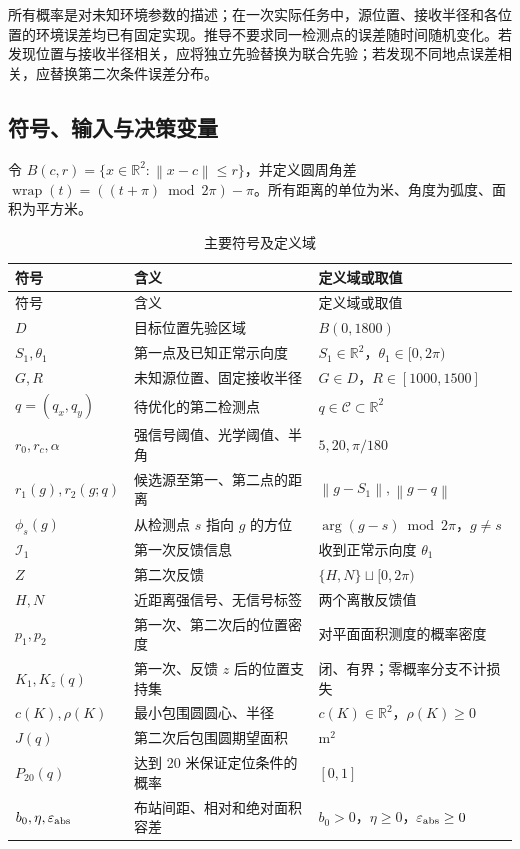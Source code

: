 \documentclass[UTF8,a4paper,zihao=-4,fontset=none]{ctexart}
\numberwithin{equation}{section}
\theoremstyle{definition}
\newcommand{\R}{\mathbb R}
\newcommand{\norm}[1]{\left\lVert #1\right\rVert}
\newcommand{\wrap}{\operatorname{wrap}}
\begin{document}
所有概率是对未知环境参数的描述；在一次实际任务中，源位置、接收半径和各位置的环境误差均已有固定实现。推导不要求同一检测点的误差随时间随机变化。若发现位置与接收半径相关，应将独立先验替换为联合先验；若发现不同地点误差相关，应替换第二次条件误差分布。

\subsection{符号、输入与决策变量}
令 \(B(c,r)=\{x\in\R^2:\norm{x-c}\le r\}\)，并定义圆周角差 \(\wrap(t)=((t+\pi)\bmod 2\pi)-\pi\)。所有距离的单位为米、角度为弧度、面积为平方米。

\begin{longtable}{p{}p{}p{}}
\caption{主要符号及定义域}\label{tab:symbols}\\
\toprule 符号 & 含义 & 定义域或取值 \\
\midrule\endfirsthead
\toprule 符号 & 含义 & 定义域或取值 \\
\midrule\endhead
\bottomrule\endfoot
\(D\) & 目标位置先验区域 & \(B(0,1800)\) \\
\(S_1,\theta_1\) & 第一点及已知正常示向度 & \(S_1\in\R^2\)，\(\theta_1\in[0,2\pi)\) \\
\(G,R\) & 未知源位置、固定接收半径 & \(G\in D\)，\(R\in[1000,1500]\) \\
\(q=(q_x,q_y)\) & 待优化的第二检测点 & \(q\in\mathcal C\subset\R^2\) \\
\(r_0,r_c,\alpha\) & 强信号阈值、光学阈值、半角 & \(5,20,\pi/180\) \\
\(r_1(g),r_2(g;q)\) & 候选源至第一、第二点的距离 & \(\norm{g-S_1},\norm{g-q}\) \\
\(\phi_s(g)\) & 从检测点 \(s\) 指向 \(g\) 的方位 & \(\arg(g-s)\bmod2\pi\)，\(g\ne s\) \\
\(\mathcal I_1\) & 第一次反馈信息 & 收到正常示向度 \(\theta_1\) \\
\(Z\) & 第二次反馈 & \(\{H,N\}\sqcup[0,2\pi)\) \\
\(H,N\) & 近距离强信号、无信号标签 & 两个离散反馈值 \\
\(p_1,p_2\) & 第一次、第二次后的位置密度 & 对平面面积测度的概率密度 \\
\(K_1,K_z(q)\) & 第一次、反馈 \(z\) 后的位置支持集 & 闭、有界；零概率分支不计损失 \\
\(c(K),\rho(K)\) & 最小包围圆圆心、半径 & \(c(K)\in\R^2\)，\(\rho(K)\ge0\) \\
\(J(q)\) & 第二次后包围圆期望面积 & \(\mathrm m^2\) \\
\(P_{20}(q)\) & 达到 20 米保证定位条件的概率 & \([0,1]\) \\
\(b_0,\eta,\varepsilon_{\rm abs}\) & 布站间距、相对和绝对面积容差 & \(b_0>0\)，\(\eta\ge0\)，\(\varepsilon_{\rm abs}\ge0\) \\
\end{longtable}
\end{document}
